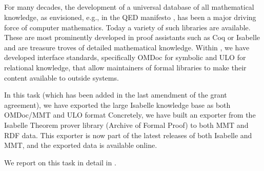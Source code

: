 \subparagraph{}
For many decades, the development of a universal database of all mathematical knowledge, as envisioned, e.g., in the QED manifesto \cite{qed}, has been a major driving force of computer mathematics.
Today a variety of such libraries are available.
These are most prominently developed in proof assistants such as Coq \cite{coq} or Isabelle \cite{isabelle} and are treasure troves of detailed mathematical knowledge.
Within \pn, we have developed interface standards, specifically OMDoc for symbolic and ULO for relational knowledge, that allow maintainers of formal libraries to make their content available to outside systems.

In this task (which has been added in the last amendment of the grant agreement), we have exported the large Isabelle knowledge base as both OMDoc/MMT and ULO format
Concretely, we have built an exporter from the Isabelle Theorem prover library (Archive of Formal Proof) to both MMT and RDF data.
This exporter is now part of the latest releases of both Isabelle and MMT, and the exported data is available online.

We report on this task in detail in .




